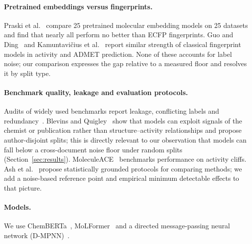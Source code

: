 \paragraph{Pretrained embeddings versus fingerprints.}
Praski et al.~\cite{praski2025benchmarking} compare 25 pretrained molecular embedding models on 25 datasets and find that nearly all perform no better than ECFP fingerprints. Guo and Ding~\cite{guo2026larger} and Kamuntavi\v{c}ius et al.~\cite{kamuntavicius2025admet} report similar strength of classical fingerprint models in activity and ADMET prediction. None of these accounts for label noise; our comparison expresses the gap relative to a measured floor and resolves it by split type.

\paragraph{Benchmark quality, leakage and evaluation protocols.}
Audits of widely used benchmarks report leakage, conflicting labels and redundancy~\cite{schuh2026auditing,huang2025litpcba}. Blevins and Quigley~\cite{blevins2025cleverhans} show that models can exploit signals of the chemist or publication rather than structure--activity relationships and propose author-disjoint splits; this is directly relevant to our observation that models can fall below a cross-document noise floor under random splits (Section~\ref{sec:results}). MoleculeACE~\cite{vantilborg2022exposing} benchmarks performance on activity cliffs. Ash et al.~\cite{ash2025practically} propose statistically grounded protocols for comparing methods; we add a noise-based reference point and empirical minimum detectable effects to that picture.

\paragraph{Models.}
We use ChemBERTa~\cite{chithrananda2020chemberta,ahmad2022chemberta2}, MoLFormer~\cite{ross2022molformer} and a directed message-passing neural network (D-MPNN)~\cite{yang2019analyzing}.
